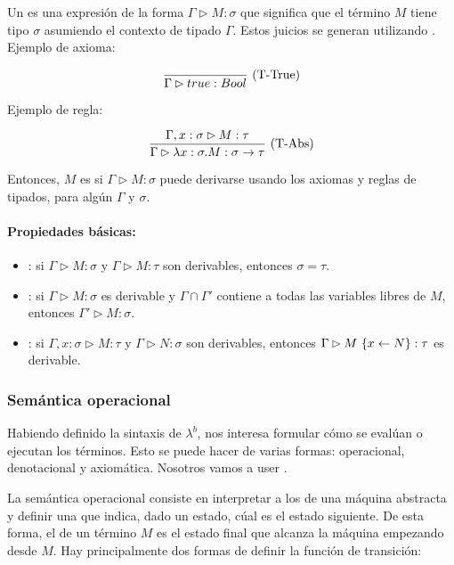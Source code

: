 Un  es una expresión de la forma $\Gamma \rhd M : \sigma$ que significa que el término $M$ tiene tipo $\sigma$ asumiendo el contexto de tipado $\Gamma$. Estos juicios se generan utilizando . Ejemplo de axioma:

\[\frac{}{\Gamma \rhd true : Bool}\ \text{(T-True)}\]

Ejemplo de regla:

\[\frac{\Gamma, x : \sigma \rhd M : \tau}{\Gamma \rhd \lambda x:\sigma.M:\sigma\to\tau}\ \text{(T-Abs)}\]

\vspace{0.5em}
Entonces, $M$ es   si $\Gamma \rhd M : \sigma$ puede derivarse usando los axiomas y reglas de tipados, para algún $\Gamma$ y $\sigma$.

\paragraph{Propiedades básicas:}

\begin{itemize}
  \item {}: si $\Gamma \rhd M : \sigma$ y $\Gamma \rhd M : \tau$ son derivables, entonces $\sigma = \tau$.
  \item {}: si $\Gamma \rhd M : \sigma$ es derivable y $\Gamma \cap \Gamma'$ contiene a todas las variables libres de $M$, entonces $\Gamma' \rhd M : \sigma$.
  \item {}: si $\Gamma,x:\sigma \rhd M : \tau$ y $\Gamma \rhd N : \sigma$ son derivables, entonces $\Gamma \rhd M\ \{x\leftarrow N\} : \tau$ es derivable.
\end{itemize}

\subsubsection{Semántica operacional}

Habiendo definido la sintaxis de $\lambda^b$, nos interesa formular cómo se evalúan o ejecutan los términos. Esto se puede hacer de varias formas: operacional, denotacional y axiomática. Nosotros vamos a user .

La semántica operacional consiste en interpretar a los  de una máquina abstracta y definir una  que indica, dado un estado, cúal es el estado siguiente. De esta forma, el  de un término $M$ es el estado final que alcanza la máquina empezando desde $M$. Hay principalmente dos formas de definir la función de transición:

